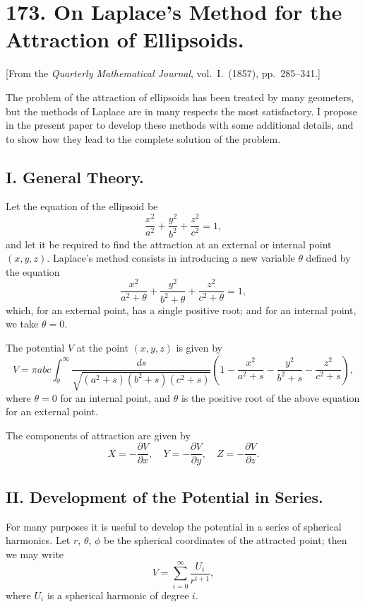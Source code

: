 \documentclass[11pt,a4paper]{book}
\begin{document}
\newpage
\section*{173. On Laplace's Method for the Attraction of Ellipsoids.}

[From the \textit{Quarterly Mathematical Journal}, vol.~I.~(1857), pp.~285--341.]

The problem of the attraction of ellipsoids has been treated by many geometers, but the methods of Laplace are in many respects the most satisfactory. I propose in the present paper to develop these methods with some additional details, and to show how they lead to the complete solution of the problem.

\subsection*{I. General Theory.}

Let the equation of the ellipsoid be
\[
\frac{x^2}{a^2} + \frac{y^2}{b^2} + \frac{z^2}{c^2} = 1,
\]
and let it be required to find the attraction at an external or internal point $(x,y,z)$. Laplace's method consists in introducing a new variable $\theta$ defined by the equation
\[
\frac{x^2}{a^2+\theta} + \frac{y^2}{b^2+\theta} + \frac{z^2}{c^2+\theta} = 1,
\]
which, for an external point, has a single positive root; and for an internal point, we take $\theta=0$.

The potential $V$ at the point $(x,y,z)$ is given by
\[
V = \pi abc \int_\theta^\infty \frac{ds}{\sqrt{(a^2+s)(b^2+s)(c^2+s)}}\left(1 - \frac{x^2}{a^2+s} - \frac{y^2}{b^2+s} - \frac{z^2}{c^2+s}\right),
\]
where $\theta=0$ for an internal point, and $\theta$ is the positive root of the above equation for an external point.

The components of attraction are given by
\[
X = -\frac{\partial V}{\partial x},\quad Y = -\frac{\partial V}{\partial y},\quad Z = -\frac{\partial V}{\partial z}.
\]

\subsection*{II. Development of the Potential in Series.}

For many purposes it is useful to develop the potential in a series of spherical harmonics. Let $r$, $\theta$, $\phi$ be the spherical coordinates of the attracted point; then we may write
\[
V = \sum_{i=0}^\infty \frac{U_i}{r^{i+1}},
\]
where $U_i$ is a spherical harmonic of degree $i$.
\end{document}
